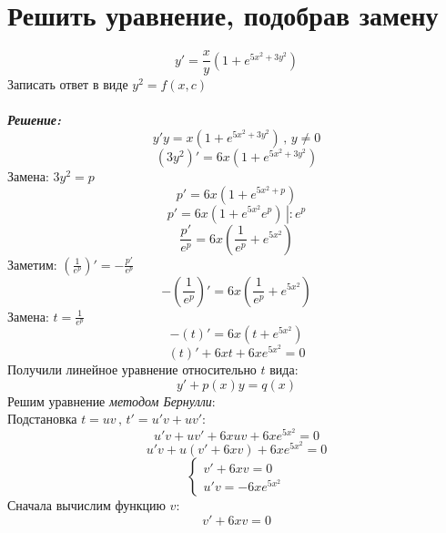 \documentclass[a5paper, 10pt]{article}
\theoremstyle{definition}
\theoremstyle{plain}
\theoremstyle{remark}
\begin{document}
\section{Решить уравнение, подобрав замену}
\begin{equation*}
y' = \frac{x}{y} \left( 1 + e^{5x^2+3y^2} \right)
\end{equation*}
Записать ответ в виде $y^2 = f(x, c)$\\\\
\textit{\textbf{Решение:}}\\
\begin{equation*}
y'y = x \left( 1 + e^{5x^2+3y^2} \right)\, ,\,  y \neq 0
\end{equation*}
\begin{equation*}
(3y^2)' =6 x \left( 1 + e^{5x^2+3y^2} \right)
\end{equation*}
Замена: $3y^2 = p$
\begin{equation*}
p' =6 x \left( 1 + e^{5x^2+p} \right)
\end{equation*}
\begin{equation*}
p' =6 x \left( 1 + e^{5x^2}e^{p} \right)  \, \left| \right. : e^p
\end{equation*}
\begin{equation*}
\frac{p'}{e^p} =6 x \left( \frac{1}{e^p} + e^{5x^2} \right)  
\end{equation*}
Заметим: $\left( \frac{1}{e^p} \right)'  = -\frac{p'}{e^{p}} $\\
\begin{equation*}
-\left( \frac{1}{e^p} \right)' =6 x \left( \frac{1}{e^p} + e^{5x^2} \right)  
\end{equation*}
Замена: $t = \frac{1}{e^p}$
\begin{equation*}
-\left( t \right)' =6 x \left( t + e^{5x^2} \right)  
\end{equation*}
\begin{equation*}
\left( t \right)' + 6 x t + 6x e^{5x^2} = 0
\end{equation*}
Получили линейное уравнение относительно $t$ вида:
\begin{equation*}
y' +p(x)y=q(x)
\end{equation*}
Решим уравнение \textit{методом Бернулли}:\\
Подстановка $t = uv \, , \, t' = u'v + uv'$:
\begin{equation*}
 u'v + uv' + 6 x uv + 6x e^{5x^2} = 0
\end{equation*}
\begin{equation*}
 u'v + u(v' + 6 x v) + 6x e^{5x^2} = 0
\end{equation*}
\begin{equation*}
 \begin{cases}
   v' + 6 x v = 0\\
   u'v = -  6x e^{5x^2}
 \end{cases}
\end{equation*}
Сначала вычислим функцию $v$:
\begin{equation*}
   v' + 6 x v = 0
\end{equation*}
\end{document}
